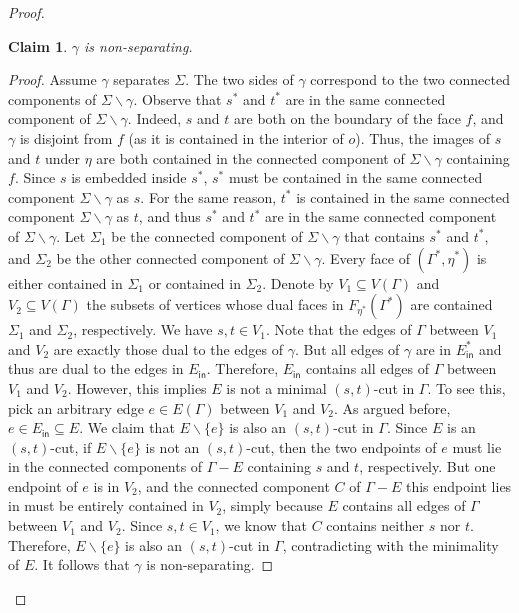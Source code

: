 \documentclass[a4paper,11pt]{article}
\numberwithin{lemma}{section}
\newtheorem{claim}[theorem]{Claim}
\newenvironment{claimproof}{\begin{proof}\renewcommand{\qedsymbol}{$\lrcorner$}}{\end{proof}}
\begin{document}
\begin{proof}
\begin{claim}
 \label{claim:gamma-non-separating}
 $\gamma$ is non-separating.
\end{claim}
\begin{claimproof}
 Assume $\gamma$ separates $\varSigma$.
 The two sides of $\gamma$ correspond to the two connected components of $\varSigma \backslash \gamma$.
 Observe that $s^*$ and $t^*$ are in the same connected component of $\varSigma \backslash \gamma$.
 Indeed, $s$ and $t$ are both on the boundary of the face $f$, and $\gamma$ is disjoint from $f$ (as it is contained in the interior of $o$).
 Thus, the images of $s$ and $t$ under $\eta$ are both contained in the connected component of $\varSigma \backslash \gamma$ containing $f$.
 Since $s$ is embedded inside $s^*$, $s^*$ must be contained in the same connected component $\varSigma \backslash \gamma$ as $s$.
 For the same reason, $t^*$ is contained in the same connected component $\varSigma \backslash \gamma$ as $t$, and thus $s^*$ and $t^*$ are in the same connected component of $\varSigma \backslash \gamma$.
 Let $\varSigma_1$ be the connected component of $\varSigma \backslash \gamma$ that contains $s^*$ and $t^*$, and $\varSigma_2$ be the other connected component of $\varSigma \backslash \gamma$.
 Every face of $(\varGamma^*,\eta^*)$ is either contained in $\varSigma_1$ or contained in $\varSigma_2$.
 Denote by $V_1 \subseteq V(\varGamma)$ and $V_2 \subseteq V(\varGamma)$ the subsets of vertices whose dual faces in $F_{\eta^*}(\varGamma^*)$ are contained $\varSigma_1$ and $\varSigma_2$, respectively.
 We have $s,t \in V_1$.
 Note that the edges of $\varGamma$ between $V_1$ and $V_2$ are exactly those dual to the edges of $\gamma$.
 But all edges of $\gamma$ are in $E_\mathsf{in}^*$ and thus are dual to the edges in $E_\mathsf{in}$.
 Therefore, $E_\mathsf{in}$ contains all edges of $\varGamma$ between $V_1$ and $V_2$.
 However, this implies $E$ is not a minimal $(s,t)$-cut in $\varGamma$.
 To see this, pick an arbitrary edge $e \in E(\varGamma)$ between $V_1$ and $V_2$.
 As argued before, $e \in E_\mathsf{in} \subseteq E$.
 We claim that $E \backslash \{e\}$ is also an $(s,t)$-cut in $\varGamma$.
 Since $E$ is an $(s,t)$-cut, if $E \backslash \{e\}$ is not an $(s,t)$-cut, then the two endpoints of $e$ must lie in the connected components of $\varGamma - E$ containing $s$ and $t$, respectively.
 But one endpoint of $e$ is in $V_2$, and the connected component $C$ of $\varGamma - E$ this endpoint lies in must be entirely contained in $V_2$, simply because $E$ contains all edges of $\varGamma$ between $V_1$ and $V_2$.
 Since $s,t \in V_1$, we know that $C$ contains neither $s$ nor $t$.
 Therefore, $E \backslash \{e\}$ is also an $(s,t)$-cut in $\varGamma$, contradicting with the minimality of $E$.
 It follows that $\gamma$ is non-separating.
\end{claimproof}


\end{proof}
\end{document}
